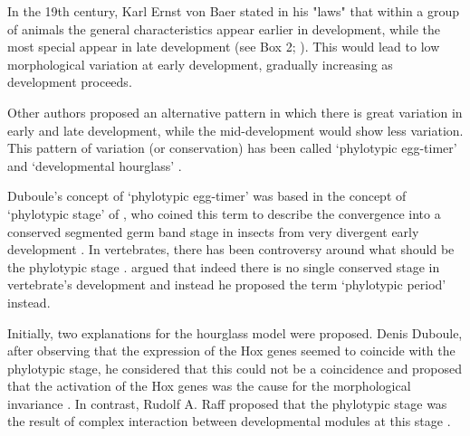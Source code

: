 
%
%
%

\label{hourglass}

In the 19th century, Karl Ernst von Baer stated in his "laws" that within a group of animals the general characteristics appear earlier in development, while the most special appear in late development (see Box 2; \citealp{vonBaer1828uber}).
This would lead to low morphological variation at early development, gradually increasing as development proceeds.

Other authors \citep{Medawar1954,Slack1993,Duboule1994,Raff1996} proposed an alternative pattern in which there is great variation in early and late development, while the mid-development would show less variation.
This pattern of variation (or conservation) has been called `phylotypic egg-timer' \citep{Duboule1994} and `developmental hourglass' \citep{Raff1996}.

Duboule's concept of `phylotypic egg-timer' was based in the concept of `phylotypic stage' of \citet{Sander1983}, who coined this term to describe the convergence into a conserved segmented germ band stage in insects from very divergent early development \citep{Sander1996}.
In vertebrates, there has been controversy around what should be the phylotypic stage \citep{Ballard1981,Slack1993,Duboule1994}. \citet{Richardson1995} argued that indeed there is no single conserved stage in vertebrate's development and instead he proposed the term `phylotypic period' instead.

Initially, two explanations for the hourglass model were proposed.
Denis Duboule, after observing that the expression of the Hox genes seemed to coincide with the phylotypic stage, he considered that this could not be a coincidence and proposed that the activation of the Hox genes was the cause for the morphological invariance \citep{Duboule1994}.
In contrast, Rudolf A. Raff proposed that the phylotypic stage was the result of complex interaction between developmental modules at this stage  \citep{Raff1996}.

